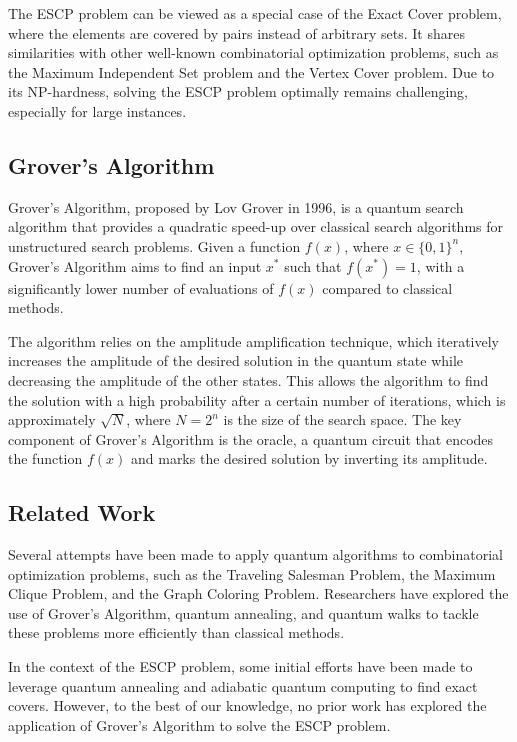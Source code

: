 The ESCP problem can be viewed as a special case of the Exact Cover problem, where the elements are covered by pairs instead of arbitrary sets. It shares similarities with other well-known combinatorial optimization problems, such as the Maximum Independent Set problem and the Vertex Cover problem. Due to its NP-hardness, solving the ESCP problem optimally remains challenging, especially for large instances.

\subsection{Grover's Algorithm}

Grover's Algorithm, proposed by Lov Grover in 1996, is a quantum search algorithm that provides a quadratic speed-up over classical search algorithms for unstructured search problems. Given a function $f(x)$, where $x \in \{0,1\}^n$, Grover's Algorithm aims to find an input $x^*$ such that $f(x^*) = 1$, with a significantly lower number of evaluations of $f(x)$ compared to classical methods.

The algorithm relies on the amplitude amplification technique, which iteratively increases the amplitude of the desired solution in the quantum state while decreasing the amplitude of the other states. This allows the algorithm to find the solution with a high probability after a certain number of iterations, which is approximately $\sqrt{N}$, where $N = 2^n$ is the size of the search space. The key component of Grover's Algorithm is the oracle, a quantum circuit that encodes the function $f(x)$ and marks the desired solution by inverting its amplitude.

\subsection{Related Work}

Several attempts have been made to apply quantum algorithms to combinatorial optimization problems, such as the Traveling Salesman Problem, the Maximum Clique Problem, and the Graph Coloring Problem. Researchers have explored the use of Grover's Algorithm, quantum annealing, and quantum walks to tackle these problems more efficiently than classical methods.

In the context of the ESCP problem, some initial efforts have been made to leverage quantum annealing and adiabatic quantum computing to find exact covers. However, to the best of our knowledge, no prior work has explored the application of Grover's Algorithm to solve the ESCP problem.

